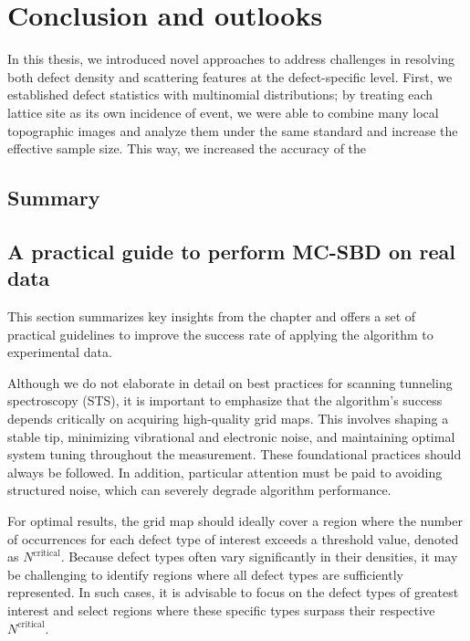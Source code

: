 \chapter{Conclusion and outlooks}
In this thesis, we introduced novel approaches to address challenges in resolving both defect density and scattering features at the defect-specific level. First, we established defect statistics with multinomial distributions; by treating each lattice site as its own incidence of event, we were able to combine many local topographic images and analyze them under the same standard and increase the effective sample size. This way, we increased the accuracy of the 



\section{Summary}

\section{A practical guide to perform MC-SBD on real data}
This section summarizes key insights from the chapter and offers a set of practical guidelines to improve the success rate of applying the algorithm to experimental data.

Although we do not elaborate in detail on best practices for scanning tunneling spectroscopy (STS), it is important to emphasize that the algorithm’s success depends critically on acquiring high-quality grid maps. This involves shaping a stable tip, minimizing vibrational and electronic noise, and maintaining optimal system tuning throughout the measurement. These foundational practices should always be followed. In addition, particular attention must be paid to avoiding structured noise, which can severely degrade algorithm performance.

For optimal results, the grid map should ideally cover a region where the number of occurrences for each defect type of interest exceeds a threshold value, denoted as $N^{\text{critical}}$. Because defect types often vary significantly in their densities, it may be challenging to identify regions where all defect types are sufficiently represented. In such cases, it is advisable to focus on the defect types of greatest interest and select regions where these specific types surpass their respective $N^{\text{critical}}$.

